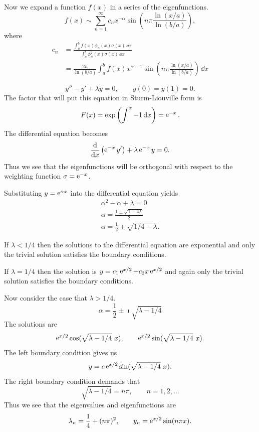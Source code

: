 {\begin{Solution}
  Now we expand a function $f(x)$ in a series of the eigenfunctions.
  \[ 
  f(x) \sim \sum_{n = 1}^\infty c_n 
  x^{-\alpha} \sin \left( n \pi \frac{\ln(x/a)}{\ln(b/a)} \right),
  \]
  where
  \begin{align*} 
    c_n     &= \frac{\int_a^b f(x) \phi_n(x) \sigma(x)\,\dd x}
    {\int_a^b \phi_n^2(x) \sigma(x)\,\dd x} \\
    &= \frac{2 n}{\ln(b/a)} \int_a^b f(x) 
    x^{\alpha - 1} \sin \left( n \pi \frac{\ln(x/a)}{\ln(b/a)} \right)
    \,\dd x
  \end{align*}
\end{Solution}









\begin{Solution}
  \label{solution y''-y'+ly=0}
  \[ y'' - y' + \lambda y = 0, \qquad y(0) = y(1) = 0. \]
  The factor that will put this equation in Sturm-Liouville form is
  \[ F(x) = \exp\left(\int^x -1\,\mathrm{d} x \right) = \mathop{\mathrm{e}}\nolimits^{-x}. \]
  The differential equation becomes
  \[ \frac{\mathrm{d}}{\mathrm{d} x} \left(\mathop{\mathrm{e}}\nolimits^{-x} y' \right) + \lambda \mathop{\mathrm{e}}\nolimits^{-x} y = 0. \]
  Thus we see that the eigenfunctions will be orthogonal with respect to
  the weighting function $\sigma = \mathop{\mathrm{e}}\nolimits^{-x}$.

  Substituting $y = \mathop{\mathrm{e}}\nolimits^{\alpha x}$ into the differential equation yields
  \begin{gather*}
    \alpha^2 - \alpha + \lambda = 0 \\
    \alpha = \frac{1 \pm \sqrt{1 - 4 \lambda}}{2} \\
    \alpha = \frac{1}{2} \pm \sqrt{1/4 - \lambda}.
  \end{gather*}

  If $\lambda < 1/4$ then the solutions to the differential equation are
  exponential and only the trivial solution satisfies the boundary conditions.

  If $\lambda = 1/4$ then the solution is $y = c_1 \mathop{\mathrm{e}}\nolimits^{x/2} + c_2x\mathop{\mathrm{e}}\nolimits^{x/2}$
  and again only the trivial solution satisfies the boundary conditions.

  Now consider the case that $\lambda > 1/4$.
  \[ \alpha = \frac{1}{2} \pm \imath \sqrt{\lambda - 1/4} \]
  The solutions are
  \[ \mathop{\mathrm{e}}\nolimits^{x/2} \cos(\sqrt{\lambda-1/4} \ x), \qquad
  \mathop{\mathrm{e}}\nolimits^{x/2} \sin(\sqrt{\lambda-1/4} \ x). \]
  The left boundary condition gives us
  \[ y = c \mathop{\mathrm{e}}\nolimits^{x/2} \sin(\sqrt{\lambda-1/4} \ x). \]
  The right boundary condition demands that
  \[ \sqrt{\lambda-1/4} = n \pi, \qquad n=1,2,\ldots \]
  Thus we see that the eigenvalues and eigenfunctions are
  \[ \lambda_n = \frac{1}{4} + (n\pi)^2, \qquad
  y_n = \mathop{\mathrm{e}}\nolimits^{x/2} \sin(n\pi x). \]


\end{Solution}}
